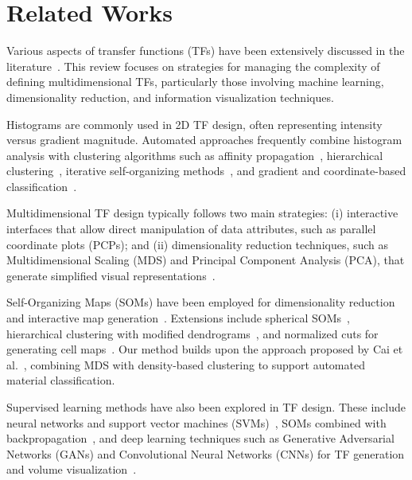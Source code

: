 \section{Related Works}
\label{sect:related-works}

Various aspects of transfer functions (TFs) have been extensively discussed in the literature~\cite{ljung2016}. This review focuses on strategies for managing the complexity of defining multidimensional TFs, particularly those involving machine learning, dimensionality reduction, and information visualization techniques.

Histograms are commonly used in 2D TF design, often representing intensity versus gradient magnitude. Automated approaches frequently combine histogram analysis with clustering algorithms such as affinity propagation~\cite{zhang2016}, hierarchical clustering~\cite{sereda2006}, iterative self-organizing methods~\cite{tzeng2004}, and gradient and coordinate-based classification~\cite{roettger2005}.

Multidimensional TF design typically follows two main strategies: (i) interactive interfaces that allow direct manipulation of data attributes, such as parallel coordinate plots (PCPs); and (ii) dimensionality reduction techniques, such as Multidimensional Scaling (MDS) and Principal Component Analysis (PCA), that generate simplified visual representations~\cite{tory2005, zhao2010, guo2011}.

Self-Organizing Maps (SOMs) have been employed for dimensionality reduction and interactive map generation~\cite{moura2007}. Extensions include spherical SOMs~\cite{khan2015}, hierarchical clustering with modified dendrograms~\cite{wang2011}, and normalized cuts for generating cell maps~\cite{cai2017}. Our method builds upon the approach proposed by Cai et al.~\cite{cai2017}, combining MDS with density-based clustering to support automated material classification.

Supervised learning methods have also been explored in TF design. These include neural networks and support vector machines (SVMs)~\cite{tzeng2005}, SOMs combined with backpropagation~\cite{wang2006}, and deep learning techniques such as Generative Adversarial Networks (GANs) and Convolutional Neural Networks (CNNs) for TF generation and volume visualization~\cite{berger2018, hong2019, kim2021, pan2024}.
